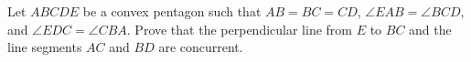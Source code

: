 Let 
$ABCDE$
 be a convex pentagon such that 
$AB=BC=CD$, 
$\angle{EAB}=\angle{BCD}$,
 and 
$\angle{EDC}=\angle{CBA}$.
 Prove that the perpendicular line from 
$E$
 to 
$BC$
 and the line segments 
$AC$
 and 
$BD$
 are concurrent.
